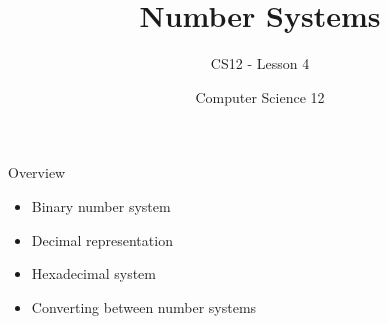\documentclass[10pt]{beamer}
\title{Number Systems}
\subtitle{CS12 - Lesson 4}
\author{Computer Science 12}
\date{}
\begin{document}
\begin{frame}
    \titlepage
\end{frame}

\begin{frame}{Overview}
    \begin{itemize}
        \item Binary number system
        \item Decimal representation
        \item Hexadecimal system
        \item Converting between number systems
    \end{itemize}
\end{frame}

\end{document}
